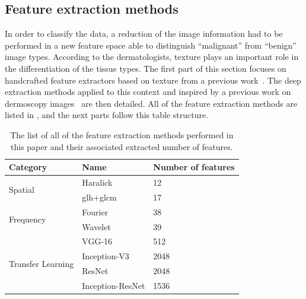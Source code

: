 \documentclass[journal,article,accept,moreauthors,pdftex, applsci]{Definitions/mdpi}
\begin{document}
\subsection{Feature extraction methods}
\label{sec:features}
In order to classify the data, a reduction of the image information had to be performed in a new feature space able to distinguish “malignant” from “benign” image types. According to the dermatologists, texture plays an important role in the differentiation of the tissue types. The first part of this section focuses on handcrafted feature extractors based on texture from a previous work~\cite{Wiltgen2008}. The deep extraction methods applied to this context and inspired by a previous work on dermoscopy images~\cite{Esteva2017} are then detailed. All of the feature extraction methods are listed in , and the next parts follow this table structure.\par
\begin{table}[H]
    \centering
    \begin{tabular}{lll}
    \hline
    \textbf{Category}                   &  \textbf{Name}                & \textbf{Number of features}  \\ \hline
    \multirow{2}{*}{Spatial}            &  Haralick                     & 12                        \\ \cline{2-3} 
                                        &  \ac{glh}+\ac{glcm}           & 17                        \\ \hline 
    \multirow{2}{*}{Frequency}          &  Fourier                      & 38                        \\ \cline{2-3} 
                                        &  Wavelet                      & 39                        \\ \hline
    \multirow{4}{*}{Transfer Learning}  &  VGG-16                       & 512                       \\ \cline{2-3} 
                                        &  Inception-V3                 & 2048                      \\ \cline{2-3} 
                                        &  ResNet                       & 2048                      \\ \cline{2-3} 
                                        &  Inception-ResNet             & 1536                      \\ \hline
    \end{tabular}
    \caption{The list of all of the feature extraction methods performed in this paper and their associated extracted number of features.}
    \label{tab:features_methods}
\end{table}\par
\end{document}
